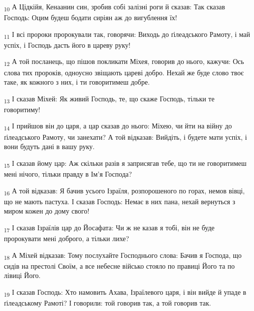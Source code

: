 \begin{tcolorbox}
\textsubscript{10} А Цідкійя, Кенаанин син, зробив собі залізні роги й сказав: Так сказав Господь: Оцим будеш бодати сиріян аж до вигублення їх!
\end{tcolorbox}
\begin{tcolorbox}
\textsubscript{11} І всі пророки пророкували так, говорячи: Виходь до ґілеадського Рамоту, і май успіх, і Господь дасть його в цареву руку!
\end{tcolorbox}
\begin{tcolorbox}
\textsubscript{12} А той посланець, що пішов покликати Міхея, говорив до нього, кажучи: Ось слова тих пророків, одноусно звіщають цареві добро. Нехай же буде слово твоє таке, як кожного з них, і ти говоритимеш добре.
\end{tcolorbox}
\begin{tcolorbox}
\textsubscript{13} І сказав Міхей: Як живий Господь, те, що скаже Господь, тільки те говоритиму!
\end{tcolorbox}
\begin{tcolorbox}
\textsubscript{14} І прийшов він до царя, а цар сказав до нього: Міхею, чи йти на війну до ґілеадського Рамоту, чи занехати? А той відказав: Вийдіть, і будете мати успіх, і вони будуть дані в вашу руку.
\end{tcolorbox}
\begin{tcolorbox}
\textsubscript{15} І сказав йому цар: Аж скільки разів я заприсягав тебе, що ти не говоритимеш мені нічого, тільки правду в Ім'я Господа?
\end{tcolorbox}
\begin{tcolorbox}
\textsubscript{16} А той відказав: Я бачив усього Ізраїля, розпорошеного по горах, немов вівці, що не мають пастуха. І сказав Господь: Немає в них пана, нехай вернуться з миром кожен до дому свого!
\end{tcolorbox}
\begin{tcolorbox}
\textsubscript{17} І сказав Ізраїлів цар до Йосафата: Чи ж не казав я тобі, він не буде пророкувати мені доброго, а тільки лихе?
\end{tcolorbox}
\begin{tcolorbox}
\textsubscript{18} А Міхей відказав: Тому послухайте Господнього слова: Бачив я Господа, що сидів на престолі Своїм, а все небесне військо стояло по правиці Його та по лівиці Його.
\end{tcolorbox}
\begin{tcolorbox}
\textsubscript{19} І сказав Господь: Хто намовить Ахава, Ізраїлевого царя, і він вийде й упаде в ґілеадському Рамоті? І говорили: той говорив так, а той говорив так.
\end{tcolorbox}
